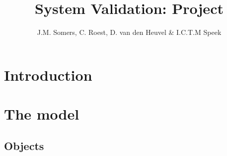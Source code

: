 \documentclass[a4paper]{article}
\title{System Validation: Project}
\author{J.M. Somers, C. Roest, D. van den Heuvel \& I.C.T.M Speek}
\begin{document}
\maketitle


\begin{comment}
  \begin{abstract}
  Your abstract.
  \end{abstract}
\end{comment}


\section{Introduction}
\label{sec:introduction}


\newpage
\section{The model}
\label{sec:model}


\subsection{Objects}
\label{sec:objects}
\end{document}
